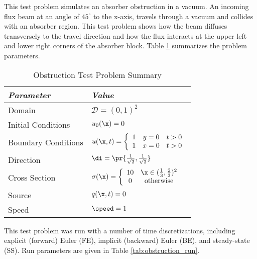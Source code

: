 This test problem simulates an absorber obstruction in a vacuum.
An incoming flux beam at an angle of $45^\circ$ to the x-axis, travels
through a vacuum and collides with an absorber region. This test
problem shows how the beam diffuses transversely to the travel direction
and how the flux interacts at the upper left and lower right corners
of the absorber block.
Table \ref{tab:obstruction} summarizes the problem parameters.

\begin{table}[htb]\caption{Obstruction Test Problem Summary}
\label{tab:obstruction}
\centering
\begin{tabular}{l l}\toprule
\emph{Parameter} & \emph{Value}\\\midrule
Domain & $\mathcal{D} = (0,1)^2$\\
Initial Conditions & $u_0(\x)=0$\\
Boundary Conditions & $u(\x,t)=\left\{\begin{array}{c c c}
  1 & y = 0 & t > 0\\
  1 & x = 0 & t > 0
  \end{array}\right.$\\
Direction & $\di = \pr{\frac{1}{\sqrt{2}},\frac{1}{\sqrt{2}}}$\\
Cross Section & $\sigma(\x)=\left\{\begin{array}{c c}
    10 & \x \in (\frac{1}{3},\frac{2}{3})^2\\
    0  & \mbox{otherwise}
  \end{array}\right.$\\
Source & $q(\x,t)=0$\\
Speed & $\speed=1$\\
\bottomrule\end{tabular}
\end{table}

This test problem was run with a number of time discretizations, including
explicit (forward) Euler (FE), implicit (backward) Euler (BE), and steady-state (SS).
Run parameters are given in Table \ref{tab:obstruction_run}.

